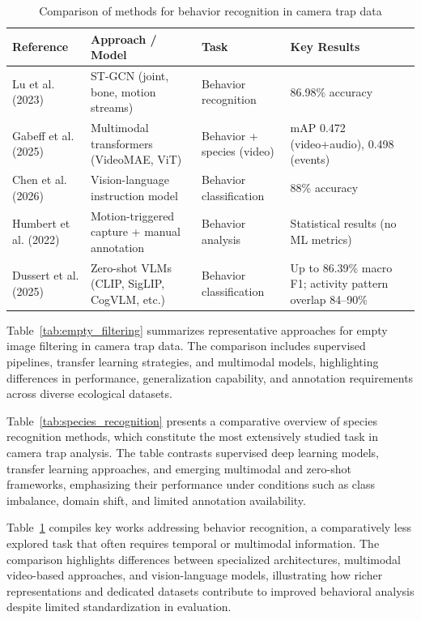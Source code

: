\begin{table}[ht]
\centering
\footnotesize
\caption{Comparison of methods for behavior recognition in camera trap data}
\label{tab:behavior_recognition}
\begin{tabular}{p{3cm} p{4.5cm} p{2.5cm} p{4cm}}
\hline
\textbf{Reference} & \textbf{Approach / Model} & \textbf{Task} & \textbf{Key Results} \\
\hline
Lu et al. (2023) \cite{lu2023mammalclub} & ST-GCN (joint, bone, motion streams) & Behavior recognition & 86.98\% accuracy \\
Gabeff et al. (2025) \cite{gabeff2025mammalps} & Multimodal transformers (VideoMAE, ViT) & Behavior + species (video) & mAP 0.472 (video+audio), 0.498 (events) \\
Chen et al. (2026) \cite{chen2026cameratrap} & Vision-language instruction model & Behavior classification & 88\% accuracy \\
Humbert et al. (2022) \cite{humbert2022associated} & Motion-triggered capture + manual annotation & Behavior analysis & Statistical results (no ML metrics) \\
Dussert et al. (2025) \cite{dussert2025zero} & Zero-shot VLMs (CLIP, SigLIP, CogVLM, etc.) & Behavior classification & Up to 86.39\% macro F1; activity pattern overlap 84--90\% \\
\hline
\end{tabular}
\end{table}

Table~\ref{tab:empty_filtering} summarizes representative approaches for empty image filtering in camera trap data. The comparison includes supervised pipelines, transfer learning strategies, and multimodal models, highlighting differences in performance, generalization capability, and annotation requirements across diverse ecological datasets.

Table~\ref{tab:species_recognition} presents a comparative overview of species recognition methods, which constitute the most extensively studied task in camera trap analysis. The table contrasts supervised deep learning models, transfer learning approaches, and emerging multimodal and zero-shot frameworks, emphasizing their performance under conditions such as class imbalance, domain shift, and limited annotation availability.

Table~\ref{tab:behavior_recognition} compiles key works addressing behavior recognition, a comparatively less explored task that often requires temporal or multimodal information. The comparison highlights differences between specialized architectures, multimodal video-based approaches, and vision-language models, illustrating how richer representations and dedicated datasets contribute to improved behavioral analysis despite limited standardization in evaluation.

